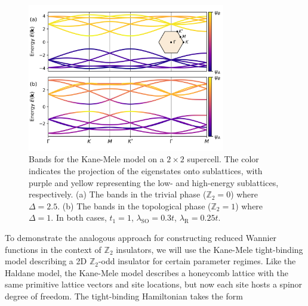 \documentclass[galley,aps,pra,10pt,amsmath,amssymb,
    superscriptaddress,nofootinbib,longbibliography]{revtex4-2}
\begin{document}
\begin{figure}[t!]
\begin{center}
\includegraphics[width=3.4in]{fig10.png}
\end{center}
\vspace{-10mm}
\caption{Bands for the Kane-Mele model on a $2\times 2$ supercell. The color indicates the projection of the eigenstates onto sublattices, with purple and yellow representing the low- and high-energy sublattices, respectively. (a) The bands in the trivial phase ($\mathbb{Z}_2=0$) where $\Delta = 2.5$. (b) The bands in the topological phase ($\mathbb{Z}_2=1$) where $\Delta = 1$. In both cases, $t_1 = 1$, $\lambda_{\textrm{SO}} = 0.3t$, $\lambda_{\textrm{R}}=0.25t$.}
\label{FIG10}
\end{figure}


To demonstrate the analogous approach for constructing reduced Wannier functions in the context of $\mathbb{Z}_2$ insulators, we will use the Kane-Mele tight-binding model describing a 2D $\mathbb{Z}_2$-odd insulator for certain parameter regimes. Like the Haldane model, the Kane-Mele model describes a honeycomb lattice with the same primitive lattice vectors and site locations, but now each site hosts a spinor degree of freedom. The tight-binding Hamiltonian takes the form
\end{document}
